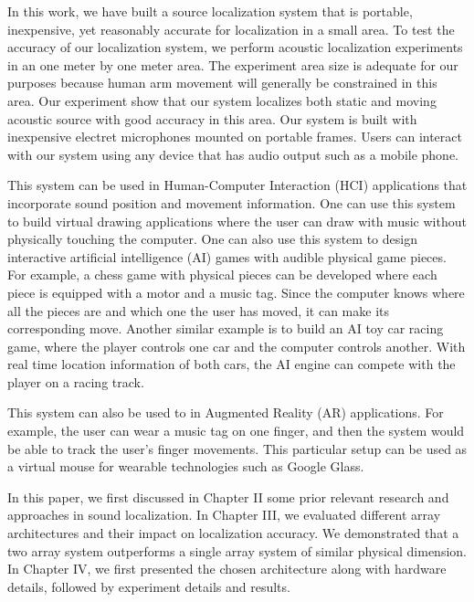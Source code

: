 In this work, we have built a source localization system that is portable, inexpensive, yet reasonably accurate for localization in a small area. To test the accuracy of our localization system, we perform acoustic localization experiments in an one meter by one meter area. The experiment area size is adequate for our purposes because human arm movement will generally be constrained in this area. Our experiment show that our system localizes both static and moving acoustic source with good accuracy in this area. Our system is built with inexpensive electret microphones mounted on portable frames. Users can interact with our system using any device that has audio output such as a mobile phone.

This system can be used in Human-Computer Interaction (HCI) applications that incorporate sound position and movement information. One can use this system to build virtual drawing applications where the user can draw with music without physically touching the computer. One can also use this system to design interactive artificial intelligence (AI) games with audible physical game pieces. For example, a chess game with physical pieces can be developed where each piece is equipped with a motor and a music tag. Since the computer knows where all the pieces are and which one the user has moved, it can make its corresponding move. Another similar example is to build an AI toy car racing game, where the player controls one car and the computer controls another. With real time location information of both cars, the AI engine can compete with the player on a racing track. 

This system can also be used to in Augmented Reality (AR) applications. For example, the user can wear a music tag on one finger, and then the system would be able to track the user's finger movements. This particular setup can be used as a virtual mouse for wearable technologies such as Google Glass. 


In this paper, we first discussed in Chapter II some prior relevant research and approaches in sound localization. In Chapter III, we evaluated different array architectures and their impact on localization accuracy. We demonstrated that a two array system outperforms a single array system of similar physical dimension. In Chapter IV, we first presented the chosen architecture along with hardware details, followed by experiment details and results. 
